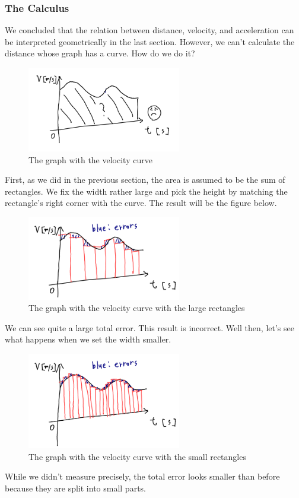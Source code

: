 \documentclass[pdflatex,sn-mathphys-num]{sn-jnl}%
\theoremstyle{thmstyleone}%
\theoremstyle{thmstyletwo}%
\theoremstyle{thmstylethree}%
\begin{document}
\subsubsection{The Calculus}
We concluded that the relation between distance, velocity, and acceleration can be interpreted geometrically in the last section. However, we can't calculate the distance whose graph has a curve. How do we do it?
\begin{figure}[H]
	\centering
	\includegraphics[width=0.6\textwidth]{images/vCurve.png}
	\caption{The graph with the velocity curve}
	\label{vCurve}
\end{figure}

First, as we did in the previous section, the area is assumed to be the sum of rectangles. We fix the width rather large and pick the height by matching the rectangle's right corner with the curve. The result will be the figure below.
\begin{figure}[H]
	\centering
	\includegraphics[width=0.6\textwidth]{images/vCurveLargeRec.png}
	\caption{The graph with the velocity curve with the large rectangles}
	\label{vCurveLR}
\end{figure}
We can see quite a large total error. This result is incorrect. Well then, let's see what happens when we set the width smaller.
\begin{figure}[H]
	\centering
	\includegraphics[width=0.6\textwidth]{images/vCurveSmallRec.png}
	\caption{The graph with the velocity curve with the small rectangles}
	\label{vCurveSR}
\end{figure}
While we didn't measure precisely, the total error looks smaller than before because they are split into small parts.
\end{document}
